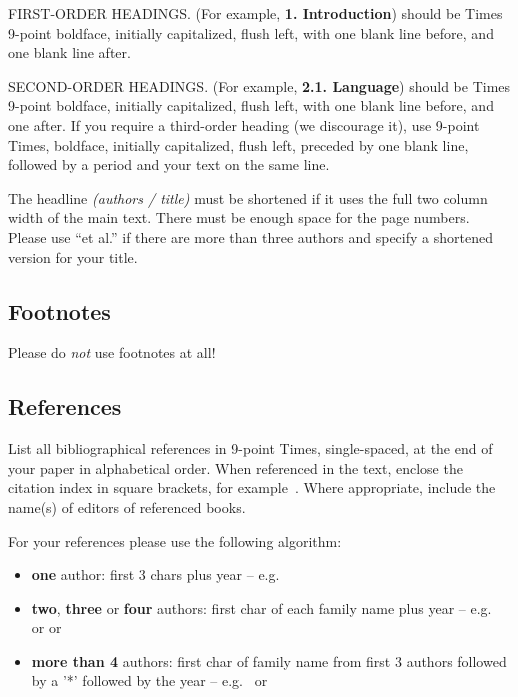 \documentclass{egpubl}
\begin{document}
FIRST-ORDER HEADINGS. (For example, \textbf{1. Introduction}) should be Times
9-point boldface, initially capitalized, flush left, with one blank line
before, and one blank line after.

SECOND-ORDER HEADINGS. (For example, \textbf{2.1. Language}) should be Times
9-point boldface, initially capitalized, flush left, with one blank line
before, and one after. If you require a third-order heading (we discourage
it), use 9-point Times, boldface, initially capitalized, flush left, preceded
by one blank line, followed by a period and your text on the same line.

The headline \emph{(authors / title)} must be shortened if it uses the full
two column width of the main text.
There must be enough space for the page numbers. Please use ``et al.'' if
there are more than three authors and specify a shortened version for your title.
\subsection{Footnotes}

Please do \emph{not} use footnotes at all!


\subsection{References}

List all bibliographical references in 9-point Times, single-spaced, at the
end of your paper in alphabetical order. When referenced in the text, enclose
the citation index in square brackets, for example~\cite{Lous90}. Where
appropriate, include the name(s) of editors of referenced books.

For your references please use the following algorithm:
\begin{itemize}
\item \textbf{one} author: first 3 chars plus year --
      e.g.\ \cite{Lous90}
\item \textbf{two}, \textbf{three} or \textbf{four} authors: first char
      of each family name plus year --  e.g.\ \cite{Fellner-Helmberg93}
      or \cite{Kobbelt97-USHDR} or \cite{Lafortune97-NARF}
\item \textbf{more than 4} authors: first char of family name from
      first 3 authors followed by a '*' followed by the year --
      e.g.\ \cite{Buhmann:1998:DCQ} or \cite{FolDamFeiHug.etal93}
\end{itemize}
\end{document}
